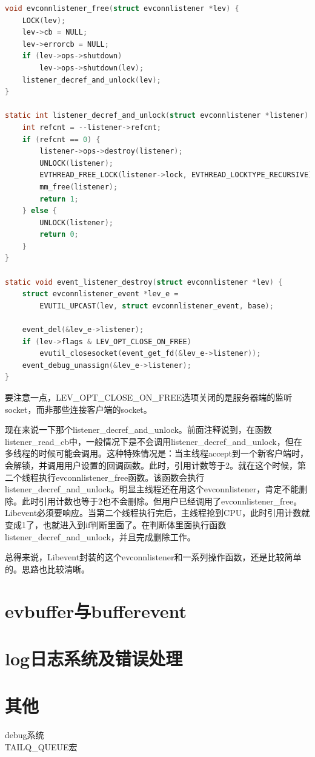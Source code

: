 \documentclass[11pt,a4paper]{article}
\begin{document}
\begin{lstlisting}[language=C]
void evconnlistener_free(struct evconnlistener *lev) {
	LOCK(lev);
	lev->cb = NULL;
	lev->errorcb = NULL;
	if (lev->ops->shutdown)
		lev->ops->shutdown(lev);
	listener_decref_and_unlock(lev);
}

static int listener_decref_and_unlock(struct evconnlistener *listener) {
	int refcnt = --listener->refcnt;
	if (refcnt == 0) {
		listener->ops->destroy(listener);
		UNLOCK(listener);
		EVTHREAD_FREE_LOCK(listener->lock, EVTHREAD_LOCKTYPE_RECURSIVE);
		mm_free(listener);
		return 1;
	} else {
		UNLOCK(listener);
		return 0;
	}
}

static void event_listener_destroy(struct evconnlistener *lev) {
	struct evconnlistener_event *lev_e =
	    EVUTIL_UPCAST(lev, struct evconnlistener_event, base);

	event_del(&lev_e->listener);
	if (lev->flags & LEV_OPT_CLOSE_ON_FREE)
		evutil_closesocket(event_get_fd(&lev_e->listener));
	event_debug_unassign(&lev_e->listener);
}
\end{lstlisting}

要注意一点，LEV\_OPT\_CLOSE\_ON\_FREE选项关闭的是服务器端的监听socket，而非那些连接客户端的socket。

现在来说一下那个listener\_decref\_and\_unlock。前面注释说到，在函数listener\_read\_cb中，一般情况下是不会调用listener\_decref\_and\_unlock，但在多线程的时候可能会调用。这种特殊情况是：当主线程accept到一个新客户端时，会解锁，并调用用户设置的回调函数。此时，引用计数等于2。就在这个时候，第二个线程执行evconnlistener\_free函数。该函数会执行listener\_decref\_and\_unlock。明显主线程还在用这个evconnlistener，肯定不能删除。此时引用计数也等于2也不会删除。但用户已经调用了evconnlistener\_free。Libevent必须要响应。当第二个线程执行完后，主线程抢到CPU，此时引用计数就变成1了，也就进入到if判断里面了。在判断体里面执行函数listener\_decref\_and\_unlock，并且完成删除工作。
 
总得来说，Libevent封装的这个evconnlistener和一系列操作函数，还是比较简单的。思路也比较清晰。

\newpage

\section{evbuffer与bufferevent}

\newpage

\section{log日志系统及错误处理}

\newpage

\section{其他}
debug系统\\
TAILQ\_QUEUE宏\\
\end{document}
